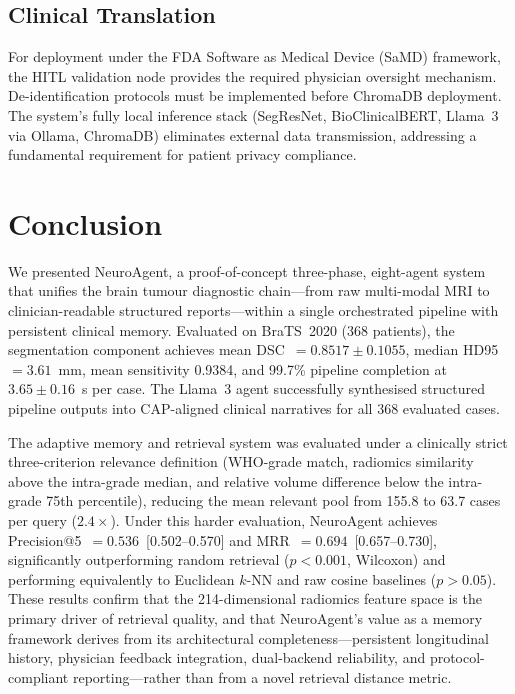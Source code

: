 \documentclass[journal]{IEEEtran}
\begin{document}
\subsection{Clinical Translation}

For deployment under the FDA Software as Medical Device (SaMD) framework,
the HITL validation node provides the required physician oversight
mechanism. De-identification protocols must be implemented before ChromaDB
deployment. The system's fully local inference stack (SegResNet,
BioClinicalBERT, Llama~3 via Ollama, ChromaDB) eliminates external data
transmission, addressing a fundamental requirement for patient privacy
compliance.

\section{Conclusion}

We presented NeuroAgent, a proof-of-concept three-phase, eight-agent system
that unifies the brain tumour diagnostic chain---from raw multi-modal MRI
to clinician-readable structured reports---within a single orchestrated
pipeline with persistent clinical memory. Evaluated on BraTS~2020
(368 patients), the segmentation component achieves mean
DSC~$= 0.8517 \pm 0.1055$, median HD95~$= 3.61$~mm, mean sensitivity
0.9384, and 99.7\% pipeline completion at $3.65 \pm 0.16$~s per case.
The Llama~3 agent successfully synthesised structured pipeline outputs
into CAP-aligned clinical narratives for all 368 evaluated cases.

The adaptive memory and retrieval system was evaluated under a clinically
strict three-criterion relevance definition (WHO-grade match, radiomics
similarity above the intra-grade median, and relative volume difference
below the intra-grade 75th percentile), reducing the mean relevant pool
from 155.8 to 63.7 cases per query ($2.4\times$). Under this harder
evaluation, NeuroAgent achieves Precision@5~$= 0.536$~[0.502--0.570] and
MRR~$= 0.694$~[0.657--0.730], significantly outperforming random retrieval
($p < 0.001$, Wilcoxon) and performing equivalently to Euclidean $k$-NN
and raw cosine baselines ($p > 0.05$). These results confirm that the
214-dimensional radiomics feature space is the primary driver of retrieval
quality, and that NeuroAgent's value as a memory framework derives from
its architectural completeness---persistent longitudinal history, physician
feedback integration, dual-backend reliability, and protocol-compliant
reporting---rather than from a novel retrieval distance metric.
\end{document}
